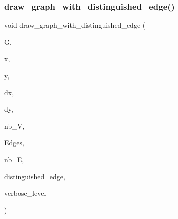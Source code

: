 \subsubsection{\texorpdfstring{draw\+\_\+graph\+\_\+with\+\_\+distinguished\+\_\+edge()}{draw\_graph\_with\_distinguished\_edge()}}
{\footnotesize\ttfamily void draw\+\_\+graph\+\_\+with\+\_\+distinguished\+\_\+edge (\begin{DoxyParamCaption}\item[{\mbox{\hyperlink{classmp__graphics}{mp\+\_\+graphics}} $\ast$}]{G,  }\item[{\mbox{\hyperlink{galois_8h_a09fddde158a3a20bd2dcadb609de11dc}{I\+NT}}}]{x,  }\item[{\mbox{\hyperlink{galois_8h_a09fddde158a3a20bd2dcadb609de11dc}{I\+NT}}}]{y,  }\item[{\mbox{\hyperlink{galois_8h_a09fddde158a3a20bd2dcadb609de11dc}{I\+NT}}}]{dx,  }\item[{\mbox{\hyperlink{galois_8h_a09fddde158a3a20bd2dcadb609de11dc}{I\+NT}}}]{dy,  }\item[{\mbox{\hyperlink{galois_8h_a09fddde158a3a20bd2dcadb609de11dc}{I\+NT}}}]{nb\+\_\+V,  }\item[{\mbox{\hyperlink{galois_8h_a09fddde158a3a20bd2dcadb609de11dc}{I\+NT}} $\ast$}]{Edges,  }\item[{\mbox{\hyperlink{galois_8h_a09fddde158a3a20bd2dcadb609de11dc}{I\+NT}}}]{nb\+\_\+E,  }\item[{\mbox{\hyperlink{galois_8h_a09fddde158a3a20bd2dcadb609de11dc}{I\+NT}}}]{distinguished\+\_\+edge,  }\item[{\mbox{\hyperlink{galois_8h_a09fddde158a3a20bd2dcadb609de11dc}{I\+NT}}}]{verbose\+\_\+level }\end{DoxyParamCaption})}

\mbox{\label{draw_8_c_abdcf81159ed67c2b19501ea77dbbf6c9}} 
